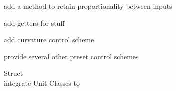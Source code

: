 \begin{DoxyRefList}
add a method to retain proportionality between inputs 



add getters for stuff 



add curvature control scheme 



provide several other preset control schemes  
\item[Struct \doxylink{structart_1_1_vec2}{art\+::Vec2} ]\hfill \\
\label{todo__todo000010}%
%
integrate Unit Classes to  
\end{DoxyRefList}
